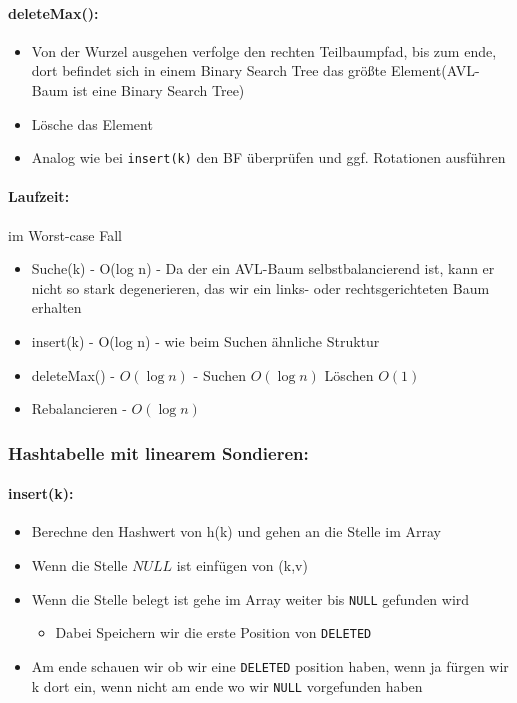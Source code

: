 \documentclass[a4paper,twoside,12pt]{article}
\begin{document}
\begin{description}
\paragraph{deleteMax():}
\begin{itemize}
	\item Von der Wurzel ausgehen verfolge den rechten Teilbaumpfad, bis zum ende, dort befindet sich in einem Binary Search Tree das größte Element(AVL-Baum ist eine Binary Search Tree)
	\item Lösche das Element
	\item Analog wie bei \texttt{insert(k)} den BF überprüfen und ggf. Rotationen ausführen
\end{itemize}

\paragraph{Laufzeit:} im Worst-case Fall
\begin{itemize}
	\item Suche(k) - O(log n) - Da der ein AVL-Baum selbstbalancierend ist, kann er nicht so stark degenerieren, das wir ein links- oder rechtsgerichteten Baum erhalten
	\item insert(k) - O(log n) - wie beim Suchen ähnliche Struktur
	\item deleteMax() - $O(\log n)$ - Suchen $O(\log n)$ Löschen $O(1)$
	\item Rebalancieren - $O(\log n)$ 
\end{itemize}


\subsubsection*{Hashtabelle mit linearem Sondieren:}
\paragraph{insert(k):}
\begin{itemize}
	\item Berechne den Hashwert von h(k) und gehen an die Stelle im Array
	\item Wenn die Stelle $NULL$ ist einfügen von (k,v)
	\item Wenn die Stelle belegt ist gehe im Array weiter bis \texttt{NULL} gefunden wird
	\begin{itemize}
		\item Dabei Speichern wir die erste Position von \texttt{DELETED}
	\end{itemize}
	\item Am ende schauen wir ob wir eine \texttt{DELETED} position haben, wenn ja fürgen wir k dort ein, wenn nicht am ende wo wir \texttt{NULL} vorgefunden haben
\end{itemize}


\end{description}
\end{document}
